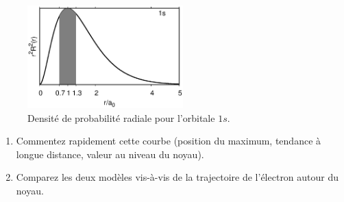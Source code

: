 \begin{figure}[h]
\begin{center}
\includegraphics[width=6cm]{figure/area_1s_3.eps}
\caption{Densit\'e de probabilit\'e radiale pour l'orbitale $1s$.}
\label{dens_prop}
\end{center}
\end{figure}


\begin{enumerate}
\item Commentez rapidement cette courbe (position du maximum, tendance à longue distance, valeur au niveau du noyau).
\item Comparez les deux mod\`eles vis-\`a-vis de la trajectoire de l'\'electron autour du noyau. 
\end{enumerate}

